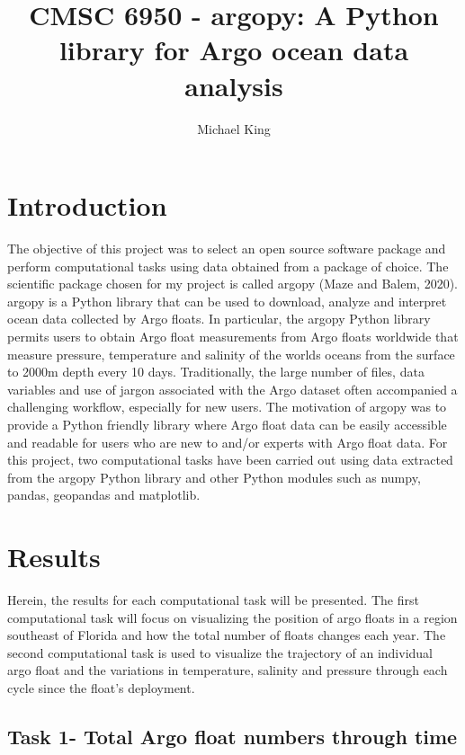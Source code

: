 \documentclass{article}
\title{CMSC 6950 - argopy: A Python library for Argo ocean data analysis}
\author{Michael King}
\begin{document}
\maketitle

\section{Introduction}

The objective of this project was to select an open source software package and perform computational tasks using data obtained from a package of choice. The scientific package chosen for my project is called argopy (Maze and Balem, 2020). argopy is a Python library that can be used to download, analyze and interpret ocean data collected by Argo floats. In particular, the argopy Python library permits users to obtain Argo float measurements from Argo floats worldwide that measure pressure, temperature and salinity of the worlds oceans from the surface to 2000m depth every 10 days. Traditionally, the large number of files, data variables and use of jargon associated with the Argo dataset often accompanied a challenging workflow, especially for new users. The motivation of argopy was to provide a Python friendly library where Argo float data can be easily accessible and readable for users who are new to and/or experts with Argo float data. For this project, two computational tasks have been carried out using data extracted from the argopy Python library and other Python modules such as numpy, pandas, geopandas and matplotlib. 

    

\section{Results}

Herein, the results for each computational task will be presented. The first computational task will focus on visualizing the position of argo floats in a region southeast of Florida and how the total number of floats changes each year. The second computational task is used to visualize the trajectory of an individual argo float and the variations in temperature, salinity and pressure through each cycle since the float's deployment.

\subsection{Task 1- Total Argo float numbers through time}
\end{document}
